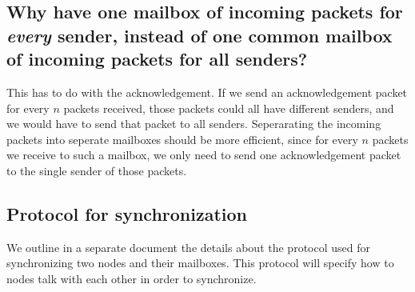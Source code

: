 \documentclass{article}
\begin{document}
\subsection{Why have one mailbox of incoming packets for \emph{every} sender, instead of one common mailbox of incoming packets for all senders?}
This has to do with the acknowledgement. If we send an acknowledgement packet for every $n$ packets received, those packets could all have different senders, and we would have to send that packet to all senders. Seperarating the incoming packets into seperate mailboxes should be more efficient, since for every $n$ packets we receive to such a mailbox, we only need to send one acknowledgement packet to the single sender of those packets.

\subsection{Protocol for synchronization}
We outline in a separate document the details about the protocol used for synchronizing two nodes and their mailboxes. This protocol will specify how to nodes talk with each other in order to synchronize.
\end{document}
